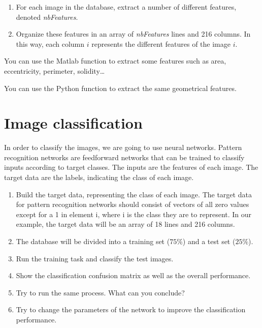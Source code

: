 \begin{qbox}
\begin{enumerate}
	\item For each image in the database, extract a number of different features, denoted \textsl{nbFeatures}.
	\item Organize these features in an array of \textsl{nbFeatures} lines and 216 columns. In this way, each column $i$ represents the different features of the image $i$.
\end{enumerate}
\end{qbox}

\begin{mcomment}
\begin{mremark}
You can use the Matlab function  to extract some features such as area, eccentricity, perimeter, solidity\dots
\end{mremark}
\end{mcomment}

\begin{pcomment}
\begin{premark}
You can use the Python function  to extract the same geometrical features.
\end{premark}
\end{pcomment}


\section{Image classification}
In order to classify the images, we are going to use neural networks. Pattern recognition networks are feedforward networks that can be trained to classify inputs according to target classes.
The inputs are the features of each image. The target data are the labels, indicating the class of each image.

\pagebreak  

\begin{qbox}
\begin{enumerate}
	\item Build the target data, representing the class of each image. The target data for pattern recognition networks should consist of vectors of all zero values except for a 1 in element i, where i is the class they are to represent. In our example, the target data will be an array of 18 lines and 216 columns.
	\item The database will be divided into a training set ($75\%$) and a test set ($25\%$).
	\item Run the training task and classify the test images.
	\item Show the classification confusion matrix as well as the overall performance.
	\item Try to run the same process. What can you conclude?
	\item Try to change the parameters of the network to improve the classification performance.
\end{enumerate}
\end{qbox}

